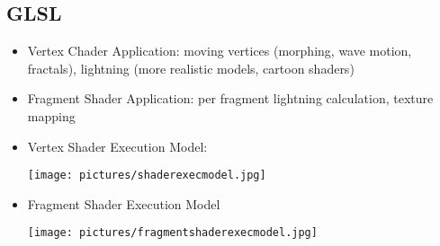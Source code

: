 \documentclass[11pt,a4paper]{article}
\begin{document}
	\subsection{GLSL}
	\begin{itemize}
		\item Vertex Chader Application: moving vertices (morphing, wave motion, fractals), lightning (more realistic models, cartoon shaders)
		\item Fragment Shader Application: per fragment lightning calculation, texture mapping
		\item Vertex Shader Execution Model:
		\begin{center}
			\texttt{[image: pictures/shaderexecmodel.jpg]}
		\end{center}
		\item Fragment Shader Execution Model
		\begin{center}
			\texttt{[image: pictures/fragmentshaderexecmodel.jpg]}
		\end{center}
	\end{itemize}
\end{document}
